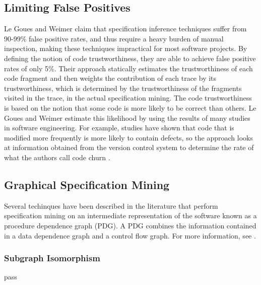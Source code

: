 \documentclass[12pt]{article}
\begin{document}
\subsection{Limiting False Positives}
Le Goues and Weimer\cite{Goues:2009:SMF:1532891.1532925} claim that
specification inference techniques suffer from 90-99\% false positive rates,
and thus require a heavy burden of manual inspection, making these techniques
impractical for most software projects. By defining the notion of code
trustworthiness, they are able to achieve false positive rates of only 5\%.
Their approach statically estimates the trustworthiness of each code fragment
and then weights the contribution of each trace by its trustworthiness, which
is determined by the trustworthiness of the fragments visited in the trace, in
the actual specification mining\cite{Goues:2009:SMF:1532891.1532925}. The code
trustworthiness is based on the notion that some code is more likely to be
correct than others. Le Goues and Weimer estimate this likelihood by using the
results of many studies in software engineering. For example, studies have
shown that code that is modified more frequently is more likely to contain
defects, so the approach looks at information obtained from the version control
system to determine the rate of what the authors call code churn
\cite{Goues:2009:SMF:1532891.1532925}.

\subsection{Graphical Specification Mining}
Several techinques have been described in the literature that perform
specification mining on an intermediate representation of the software known
as a procedure dependence graph (PDG). A PDG combines the information contained
in a data dependence graph and a control flow graph. For more information, see
\cite{Ferrante:1987:PDG:24039.24041}.

\subsubsection{Subgraph Isomorphism}
pass
\end{document}
